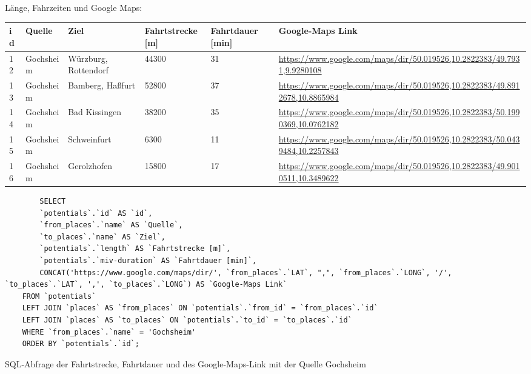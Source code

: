 Länge, Fahrzeiten und Google Maps:
\newline
\begin{tabular}{| l | l | l | l | l | l |}
    \hline
    id & Quelle & Ziel & Fahrtstrecke [m] & Fahrtdauer [min] & Google-Maps Link\\ 
    \hline
    12 & Gochsheim & Würzburg, Rottendorf & 44300 & 31 & \href{https://www.google.com/maps/dir/50.019526,10.2822383/49.7931,9.9280108}{https://www.google.com/maps/dir/50.019526,10.2822383/49.7931,9.9280108}\\ 
    \hline
    13 & Gochsheim & Bamberg, Haßfurt & 52800 & 37 & \href{https://www.google.com/maps/dir/50.019526,10.2822383/49.8912678,10.8865984}{https://www.google.com/maps/dir/50.019526,10.2822383/49.8912678,10.8865984}\\ 
    \hline
    14 & Gochsheim & Bad Kissingen & 38200 & 35 & \href{https://www.google.com/maps/dir/50.019526,10.2822383/50.1990369,10.0762182}{https://www.google.com/maps/dir/50.019526,10.2822383/50.1990369,10.0762182}\\ 
    \hline
    15 & Gochsheim & Schweinfurt & 6300 & 11 & \href{https://www.google.com/maps/dir/50.019526,10.2822383/50.0439484,10.2257843}{https://www.google.com/maps/dir/50.019526,10.2822383/50.0439484,10.2257843}\\ 
    \hline
    16 & Gochsheim & Gerolzhofen & 15800 & 17 & \href{https://www.google.com/maps/dir/50.019526,10.2822383/49.9010511,10.3489622}{https://www.google.com/maps/dir/50.019526,10.2822383/49.9010511,10.3489622}\\ 
    \hline
\end{tabular}    
\newline
\newline
\begin{listing}[htbp]
    \begin{verbatim}
        SELECT 
        `potentials`.`id` AS `id`, 
        `from_places`.`name` AS `Quelle`,
        `to_places`.`name` AS `Ziel`, 
        `potentials`.`length` AS `Fahrtstrecke [m]`, 
        `potentials`.`miv-duration` AS `Fahrtdauer [min]`,
        CONCAT('https://www.google.com/maps/dir/', `from_places`.`LAT`, ",", `from_places`.`LONG`, '/', `to_places`.`LAT`, ',', `to_places`.`LONG`) AS `Google-Maps Link`
    FROM `potentials`
    LEFT JOIN `places` AS `from_places` ON `potentials`.`from_id` = `from_places`.`id`
    LEFT JOIN `places` AS `to_places` ON `potentials`.`to_id` = `to_places`.`id`
    WHERE `from_places`.`name` = 'Gochsheim'
    ORDER BY `potentials`.`id`;
    \end{verbatim}
    \caption{SQL-Abfrage der Fahrtstrecke, Fahrtdauer und des Google-Maps-Link mit der Quelle Gochsheim}\label{lst-f-gochsheim}
\end{listing}